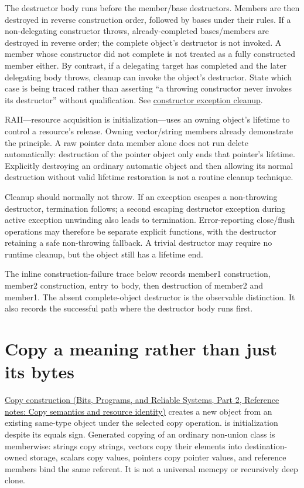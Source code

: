 The destructor body runs before the member/base destructors. Members are then destroyed in reverse construction order, followed by bases under their rules. If a non-delegating constructor throws, already-completed bases/members are destroyed in reverse order; the complete object's destructor is not invoked. A member whose constructor did not complete is not treated as a fully constructed member either. By contrast, if a delegating target has completed and the later delegating body throws, cleanup can invoke the object's destructor. State which case is being traced rather than asserting ``a throwing constructor never invokes its destructor'' without qualification. See \href{https://eel.is/c++draft/except.ctor}{constructor exception cleanup}.

RAII---resource acquisition is initialization---uses an owning object's lifetime to control a resource's release. Owning vector/string members already demonstrate the principle. A raw pointer data member alone does not run delete automatically: destruction of the pointer object only ends that pointer's lifetime. Explicitly destroying an ordinary automatic object and then allowing its normal destruction without valid lifetime restoration is not a routine cleanup technique.

Cleanup should normally not throw. If an exception escapes a non-throwing destructor, termination follows; a second escaping destructor exception during active exception unwinding also leads to termination. Error-reporting close/flush operations may therefore be separate explicit functions, with the destructor retaining a safe non-throwing fallback. A trivial destructor may require no runtime cleanup, but the object still has a lifetime end.

The inline construction-failure trace below records member1 construction, member2 construction, entry to body, then destruction of member2 and member1. The absent complete-object destructor is the observable distinction. It also records the successful path where the destructor body runs first.

\section{Copy a meaning rather than just its bytes}\label{05-engine-i-ch003-copy-a-meaning-rather-than-just-its-bytes}

\hypertarget{05-engine-i-ch003-copy-a-meaning-rather-than-just-its-bytes}{}

\href{../01-Bits-Programs-and-Reliable-Systems-P02/main.pdf\#appendix-1340cd1ce582}{Copy construction (Bits, Programs, and Reliable Systems, Part 2, Reference notes: Copy semantics and resource identity)} creates a new object from an existing same-type object under the selected copy operation.  is initialization despite its equals sign. Generated copying of an ordinary non-union class is memberwise: strings copy strings, vectors copy their elements into destination-owned storage, scalars copy values, pointers copy pointer values, and reference members bind the same referent. It is not a universal memcpy or recursively deep clone.

